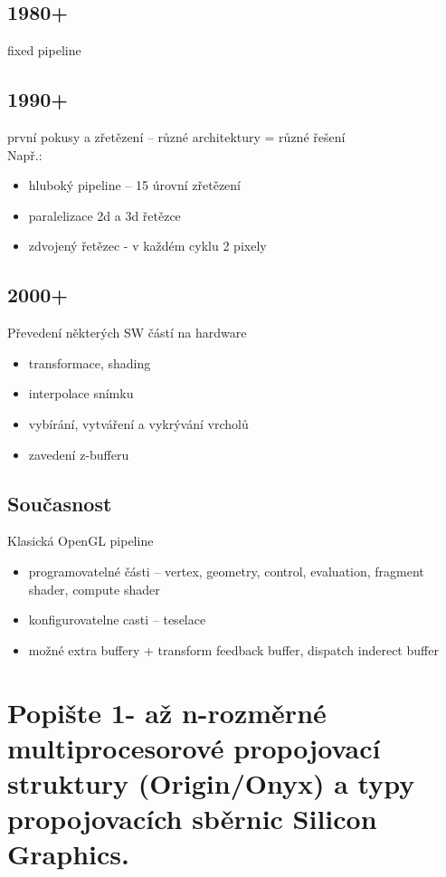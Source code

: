 	\subsection*{1980+}
		fixed pipeline
		
	\subsection*{1990+}
		první pokusy a zřetězení -- různé architektury = různé řešení \\
		Např.:
		\begin{itemize}
			\setlength\itemsep{0em}
			\item hluboký pipeline -- 15 úrovní zřetězení
			\item paralelizace 2d a 3d řetězce
			\item zdvojený řetězec - v každém cyklu 2 pixely
		\end{itemize}
	
	\subsection*{2000+}
		Převedení některých SW částí na hardware
		\begin{itemize}
			\setlength\itemsep{0em}
			\item transformace, shading
			\item interpolace snímku
			\item vybírání, vytváření a vykrývání vrcholů
			\item zavedení z-bufferu
		\end{itemize}
	
	\subsection*{Současnost}
		Klasická OpenGL pipeline
		\begin{itemize}
			\setlength\itemsep{0em}
			\item programovatelné části -- vertex, geometry, control, evaluation, fragment shader, compute shader
			\item konfigurovatelne casti -- teselace
			\item možné extra buffery + transform feedback buffer, dispatch inderect buffer
		\end{itemize}


\section{Popište 1- až n-rozměrné multiprocesorové propojovací struktury (Origin/Onyx) a typy propojovacích sběrnic Silicon Graphics.}
